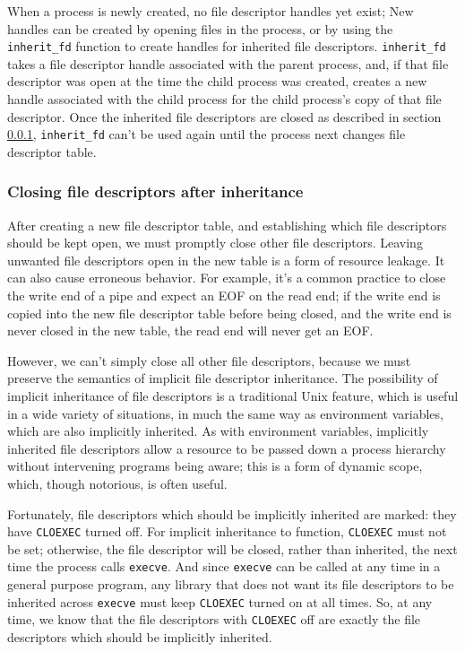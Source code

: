 \documentclass[sigplan]{acmart}
\begin{document}
When a process is newly created,
no file descriptor handles yet exist;
New handles can be created by opening files in the process,
or by using the \verb|inherit_fd| function to create handles for inherited file descriptors.
\verb|inherit_fd| takes a file descriptor handle associated with the parent process,
and, if that file descriptor was open at the time the child process was created,
creates a new handle associated with the child process
for the child process's copy of that file descriptor.
Once the inherited file descriptors are closed as described in section \ref{cloexec},
\verb|inherit_fd| can't be used again until the process next changes file descriptor table.
\subsubsection{Closing file descriptors after inheritance}\label{cloexec}
After creating a new file descriptor table,
and establishing which file descriptors should be kept open,
we must promptly close other file descriptors.
Leaving unwanted file descriptors open in the new table is a form of resource leakage.
It can also cause erroneous behavior.
For example, it's a common practice to close the write end of a pipe
and expect an EOF on the read end;
if the write end is copied into the new file descriptor table before being closed,
and the write end is never closed in the new table,
the read end will never get an EOF.

However, we can't simply close all other file descriptors,
because we must preserve the semantics of implicit file descriptor inheritance.
The possibility of implicit inheritance of file descriptors is a traditional Unix feature,
which is useful in a wide variety of situations,
in much the same way as environment variables, which are also implicitly inherited.
As with environment variables,
implicitly inherited file descriptors allow a resource to be passed down a process hierarchy
without intervening programs being aware;
this is a form of dynamic scope, which, though notorious, is often useful.

Fortunately, file descriptors which should be implicitly inherited are marked:
they have \texttt{CLOEXEC} turned off.
For implicit inheritance to function, \texttt{CLOEXEC} must not be set;
otherwise, the file descriptor will be closed, rather than inherited,
the next time the process calls \texttt{execve}.
And since \texttt{execve} can be called at any time in a general purpose program,
any library that does not want its file descriptors to be inherited across \texttt{execve}
must keep \texttt{CLOEXEC} turned on at all times.
So, at any time, we know that the file descriptors with \texttt{CLOEXEC} off
are exactly the file descriptors which should be implicitly inherited.
\end{document}
